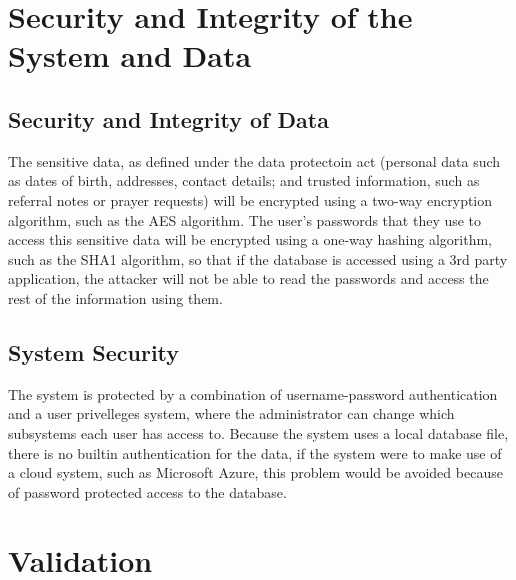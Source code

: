 \section{Security and Integrity of the System and Data}

\subsection{Security and Integrity of Data}
	The sensitive data, as defined under the data protectoin act (personal data such as dates of birth, addresses, contact details; and
	trusted information, such as referral notes or prayer requests) will be encrypted using a two-way encryption algorithm, such as the
	AES algorithm.
	The user's passwords that they use to access this sensitive data will be encrypted using a one-way hashing algorithm, such as the SHA1
	algorithm, so that if the database is accessed using a 3rd party application, the attacker will not be able to read the passwords and
	access the rest of the information using them.


\subsection{System Security}
	The system is protected by a combination of username-password authentication and a user privelleges system, where the administrator can
	change which subsystems each user has access to. Because the system uses a local database file, there is no builtin authentication for
	the data, if the system were to make use of a cloud system, such as Microsoft Azure, this problem would be avoided because of password
	protected  access to the database.

\section{Validation}

